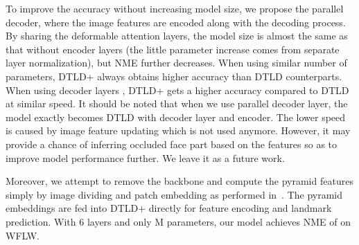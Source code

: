 To improve the accuracy without increasing model size, we propose the parallel decoder, where the image features are encoded along with the decoding process.
By sharing the deformable attention layers, the model size is almost the same as that without encoder layers (the little parameter increase comes from separate layer normalization), but NME further decreases. When using similar number of parameters, DTLD+ always obtains higher accuracy than DTLD counterparts. When using decoder layers , DTLD+ gets a higher accuracy compared to DTLD at similar speed.
It should be noted that when we use  parallel decoder layer, the model exactly becomes DTLD with  decoder layer and  encoder. The lower speed is caused by image feature updating which is not used anymore. However, it may provide a chance of inferring occluded face part based on the features so as to improve model performance further. We leave it as a future work.

Moreover, we attempt to remove the backbone and compute the pyramid features simply by image dividing and patch embedding as performed in~\cite{PVT}. The pyramid embeddings are fed into DTLD+ directly for feature encoding and landmark prediction. With 6 layers and only M parameters, our model achieves NME of  on WFLW.







\begin{table}[!t]\centering
    \vspace{-3mm}
    \caption{Cross-dataset evaluation and comparison with others. \emph{ST} means supervised training only on 300W training data, but test on others. \emph{UDA} means unsupervised domain adaption by utilizing COFW and WFLW training images without annotation used.}
    \label{res:crossdataeva}
\end{table}

